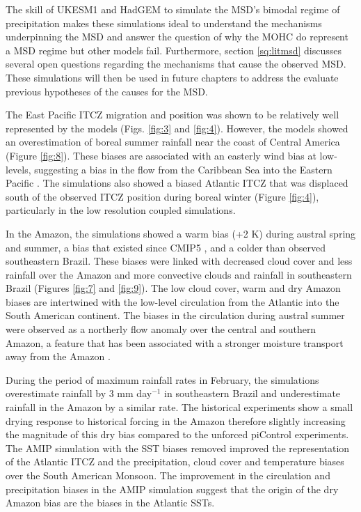 The skill of UKESM1 and HadGEM to simulate the MSD's bimodal regime of precipitation makes these simulations ideal to understand the mechanisms underpinning the MSD and answer the question of why the MOHC do represent a MSD regime but other models fail. Furthermore, section \ref{sq:litmsd} discusses several open questions regarding the mechanisms that cause the observed MSD. These simulations will then be used in future chapters to address the evaluate previous hypotheses of the causes for the MSD. 


The East Pacific ITCZ migration and position was shown to be relatively well represented by the models (Figs. \ref{fig:3} and \ref{fig:4}). However, the models showed an overestimation of boreal summer rainfall near the coast of Central America (Figure \ref{fig:8}). These biases are associated with an easterly wind bias at low-levels, suggesting a bias in the flow from the Caribbean Sea into the Eastern Pacific  \citep{herrera2015,duranquesada2017}. 
The simulations also showed a biased Atlantic ITCZ that was displaced south of the observed ITCZ position during boreal winter (Figure \ref{fig:4}), particularly in the low resolution coupled simulations. 

In the Amazon, the simulations showed a warm bias (+2 K) during austral spring and summer, a bias that existed since CMIP5 \citep{jones2013}, and a colder than observed southeastern Brazil.
 These biases were linked with decreased cloud cover and less rainfall over the Amazon and more convective clouds and rainfall in southeastern Brazil (Figures \ref{fig:7} and \ref{fig:9}). 
The low cloud cover, warm and dry Amazon biases are intertwined with the low-level circulation from the Atlantic into the South American continent. The biases in the circulation during austral summer were observed as a northerly flow anomaly over the central and southern Amazon, a feature that has been associated with a stronger moisture transport away from the Amazon \citep{marengo2012,jones2017}. %


During the period of maximum rainfall rates in February, the simulations overestimate rainfall by 3 mm day$^{-1}$ in southeastern Brazil and underestimate rainfall in the Amazon by a similar rate. The historical experiments show a small drying response to historical forcing in the Amazon therefore slightly increasing the magnitude of this dry bias compared to the unforced piControl experiments.
The AMIP simulation with the SST biases removed improved the representation of the Atlantic ITCZ and the precipitation, cloud cover and temperature biases over the South American Monsoon.   The improvement in the circulation and precipitation biases in the AMIP simulation suggest that the origin of the dry Amazon bias are the biases in the Atlantic SSTs. 

